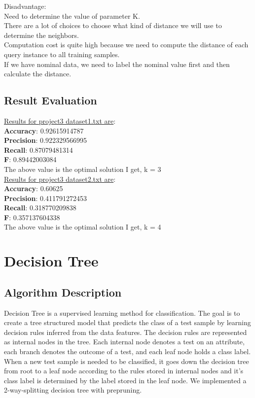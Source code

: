 \documentclass[paper=letter, fontsize=11pt]{article}
\numberwithin{equation}{section}		%
\numberwithin{figure}{section}			%
\numberwithin{table}{section}				%
\begin{document}
\noindent Disadvantage:\\
Need to determine the value of parameter K.\\
There are a lot of choices to choose what kind of distance we will use to determine the neighbors.\\
Computation cost is quite high because we need to compute the distance of each query instance to all training samples.\\
If we have nominal data, we need to label the nominal value first and then calculate the distance.\\
\subsection{Result Evaluation}
\noindent \underline{Results for project3 dataset1.txt are}: \\ 
\textbf{Accuracy}: 0.92615914787\\
\textbf{Precision}: 0.922329566995\\
\textbf{Recall}: 0.87079481314\\
\textbf{F}: 0.89442003084\\

\noindent The above value is the optimal solution I get, k = 3\\

\noindent \underline{Results for project3 dataset2.txt are}:\\
\textbf{Accuracy}: 0.60625\\
\textbf{Precision}: 0.411791272453\\
\textbf{Recall}: 0.318770209838\\
\textbf{F}: 0.357137604338\\

\noindent The above value is the optimal solution I get, k = 4
\section{Decision Tree}
\subsection{Algorithm Description}
Decision Tree is a supervised learning method for classification. The goal is to create
a tree structured model that predicts the class of a test sample by learning decision
rules inferred from the data features. The decision rules are represented as internal
nodes in the tree. Each internal node denotes a test on an attribute, each branch denotes
the outcome of a test, and each leaf node holds a class label. When a new test
sample is needed to be classified, it goes down the decision tree from root to a leaf
node according to the rules stored in internal nodes and it's class label is determined
by the label stored in the leaf node. We implemented a 2-way-splitting decision tree
with prepruning.
\end{document}
